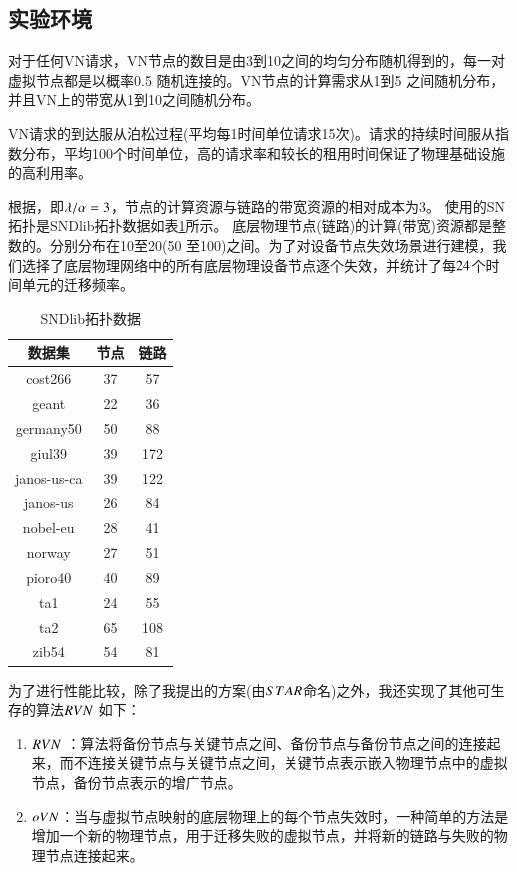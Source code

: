 \subsection{实验环境}
对于任何VN请求，VN节点的数目是由3到10之间的均匀分布随机得到的，每一对虚拟节点都是以概率0.5 随机连接的。VN节点的计算需求从1到5 之间随机分布，并且VN上的带宽从1到10之间随机分布。

VN请求的到达服从泊松过程(平均每1时间单位请求15次)。请求的持续时间服从指数分布，平均100个时间单位，高的请求率和较长的租用时间保证了物理基础设施的高利用率。

根据\cite{yu2010survivable}，即$\lambda/\alpha=3$，节点的计算资源与链路的带宽资源的相对成本为3。 使用的SN 拓扑是SNDlib拓扑数据\cite{orlowski2010sndlib}如表\ref{tab:SNDlibTopo}所示。 底层物理节点(链路)的计算(带宽)资源都是整数的。分别分布在10至20(50 至100)之间。为了对设备节点失效场景进行建模，我们选择了底层物理网络中的所有底层物理设备节点逐个失效，并统计了每$24$个时间单元的迁移频率。
\begin{table}[htb]
\centering
\caption{SNDlib拓扑数据}\label{tab:SNDlibTopo}
\begin{tabular}{|c|c|c|}
  \hline
  数据集 & 节点 & 链路 \\
  \hline
  cost266& 37& 57\\
  geant& 22& 36\\
  germany50& 50& 88\\
  giul39& 39& 172\\
  janos-us-ca& 39& 122\\
  janos-us& 26& 84\\
  nobel-eu& 28& 41\\
  norway& 27& 51\\
  pioro40& 40& 89\\
  ta1& 24& 55\\
  ta2& 65& 108\\
  zib54& 54& 81\\
  \hline

\end{tabular}
\end{table}

为了进行性能比较，除了我提出的方案(由$STAR$命名)之外，我还实现了其他可生存的算法$RVN$ \cite{yeow2011designing}如下：
\begin{enumerate}
  \item $RVN$ ：算法将备份节点与关键节点之间、备份节点与备份节点之间的连接起来，而不连接关键节点与关键节点之间，关键节点表示嵌入物理节点中的虚拟节点，备份节点表示的增广节点。
  \item $oVN$：当与虚拟节点映射的底层物理上的每个节点失效时，一种简单的方法是增加一个新的物理节点，用于迁移失败的虚拟节点，并将新的链路与失败的物理节点连接起来。
\end{enumerate}

